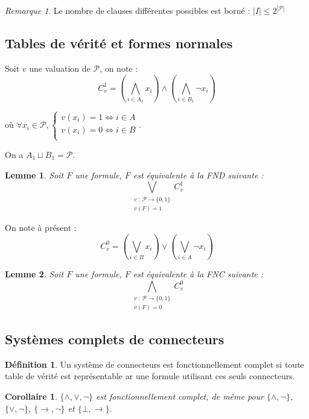 \documentclass[]{article}
\newtheorem{mylemma}{Lemme}
\newtheorem{mycor}{Corollaire}
\theoremstyle{remark}
\newtheorem{myrem}{Remarque}
\theoremstyle{definition}
\newtheorem{mydef}{Définition}
\newcommand{\funcshort}[3]{
#1 ~ : ~ #2 \longrightarrow #3
}
\begin{document}
\begin{myrem}
	Le nombre de clauses différentes possibles est borné : $|I| \leqslant 2^{|\mathcal{P}|}$
\end{myrem}

\subsection{Tables de vérité et formes normales}

Soit $v$ une valuation de $\mathcal{P}$, on note : $$C_v^1 = \left(\bigwedge_{i \in A_1} x_i\right) \land \left(\bigwedge_{i \in B_1} \neg x_i\right)$$

où $\forall x_i \in \mathcal{P}, \left\{
\begin{array}{l}
	v(x_i) = 1 \Longleftrightarrow i \in A \\
	v(x_i) = 0 \Longleftrightarrow i \in B \\
\end{array}
\right.$.

On a $A_1 \sqcup B_1 = \mathcal{P}$.

\begin{mylemma}
	Soit $F$ une formule, $F$ est équivalente à la FND suivante : $$\bigvee\limits_{\substack{\funcshort{v}{\mathcal{P}}{\{0, 1\} \\ \overline{v}(F) = 1}}} C_v^1$$
\end{mylemma}

On note à présent : $$C_v^0 = \left(\bigvee_{i \in B} x_i\right) \lor \left(\bigvee_{i \in A} \neg x_i\right)$$

\begin{mylemma}
	Soit $F$ une formule, $F$ est équivalente à la FNC suivante : $$\bigwedge\limits_{\substack{\funcshort{v}{\mathcal{P}}{\{0, 1\} \\ \overline{v}(F) = 0}}} C_v^0$$
\end{mylemma}

\subsection{Systèmes complets de connecteurs}

\begin{mydef}
	Un système de connecteurs est fonctionnellement complet si toute table de vérité est représentable ar une formule utilisant ces seuls connecteurs.
\end{mydef}

\begin{mycor}
	$\{\land, \lor, \neg\}$ est fonctionnellement complet, de même pour $\{\land, \neg\}$, $\{\lor, \neg\}$, $\{\rightarrow, \neg\}$ et $\{\bot, \rightarrow\}$.
\end{mycor}
\end{document}
